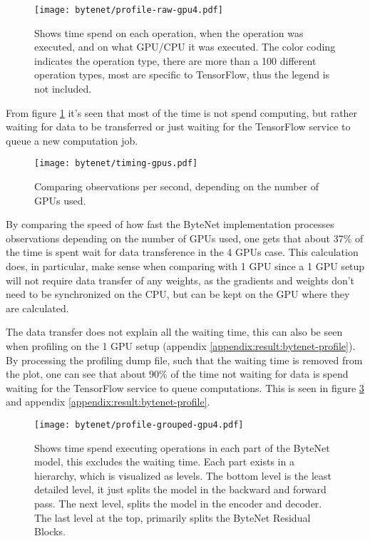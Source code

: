 \begin{figure}[h]
    \centering
    \texttt{[image: bytenet/profile-raw-gpu4.pdf]}
    \caption{Shows time spend on each operation, when the operation was executed, and on what GPU/CPU it was executed. The color coding indicates the operation type, there are more than a 100 different operation types, most are specific to TensorFlow, thus the legend is not included.}
    \label{fig:result:bytenet:profile-raw}
\end{figure}

From figure \ref{fig:result:bytenet:profile-raw} it's seen that most of the time is not spend computing, but rather waiting for data to be transferred or just waiting for the TensorFlow service to queue a new computation job.

\begin{figure}[h]
    \centering
    \texttt{[image: bytenet/timing-gpus.pdf]}
    \caption{Comparing observations per second, depending on the number of GPUs used.}
    \label{fig:result:bytenet:timing-gpus}
\end{figure}

By comparing the speed of how fast the ByteNet implementation processes observations depending on the number of GPUs used, one gets that about 37\% of the time is spent wait for data transference in the 4 GPUs case. This calculation does, in particular, make sense when comparing with 1 GPU since a 1 GPU setup will not require data transfer of any weights, as the gradients and weights don't need to be synchronized on the CPU, but can be kept on the GPU where they are calculated.

The data transfer does not explain all the waiting time, this can also be seen when profiling on the 1 GPU setup (appendix \ref{appendix:result:bytenet-profile}). By processing the profiling dump file, such that the waiting time is removed from the plot, one can see that about 90\% of the time not waiting for data is spend waiting for the TensorFlow service to queue computations. This is seen in figure \ref{fig:result:bytenet:profile-grouped} and appendix \ref{appendix:result:bytenet-profile}. 


\begin{figure}[h]
    \centering
    \texttt{[image: bytenet/profile-grouped-gpu4.pdf]}
    \caption{Shows time spend executing operations in each part of the ByteNet model, this excludes the waiting time. Each part exists in a hierarchy, which is visualized as levels. The bottom level is the least detailed level, it just splits the model in the backward and forward pass. The next level, splits the model in the encoder and decoder. The last level at the top, primarily splits the ByteNet Residual Blocks.}
    \label{fig:result:bytenet:profile-grouped}
\end{figure}

